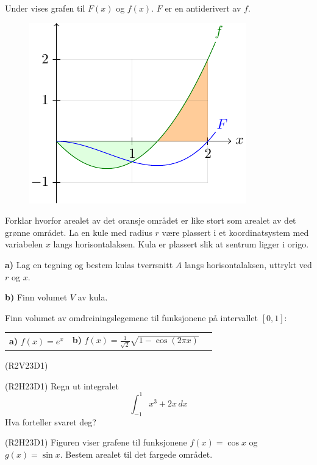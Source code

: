 Under vises grafen til $ F(x) $ og $ f(x) $. $ F $ er en antiderivert av $ f $.
\begin{figure}
	\centering
	\includegraphics[scale=0.9]{../fig/faropg}\\
	\raggedright
\end{figure}
Forklar hvorfor arealet av det oransje området er like stort som arealet av det grønne området.
\newpage
\nes
{}
La en kule med radius $ r $ være plassert i et koordinatsystem med variabelen $ x $ langs horisontalaksen. Kula er plassert slik at sentrum ligger i origo.\os

\textbf{a)} Lag en tegning og bestem kulas tverrsnitt $ A $ langs horisontalaksen, uttrykt ved $ r $ og $ x $.\os

\textbf{b)} Finn volumet $ V $ av kula.

Finn volumet av omdreiningslegemene til funksjonene på intervallet $ [0, 1] $:\os

\begin{tabular}{@{}l l l}	
	\textbf{a)} $ f(x)=e^x  $&\quad\textbf{b)} $\displaystyle f(x)= \frac{1}{\sqrt{2}}\sqrt{1-\cos(2 \pi x)}$ &\quad
\end{tabular}
\newpage
{}
(R2V23D1)

(R2H23D1)\os
Regn ut integralet
\[ \int_{-1}^{1}x^3+2x\,dx \]
Hva forteller svaret deg?


(R2H23D1)\os
Figuren viser grafene til funksjonene $ f(x)=\cos x$ og $ g(x)=\sin x $.
Bestem arealet til det fargede området.

